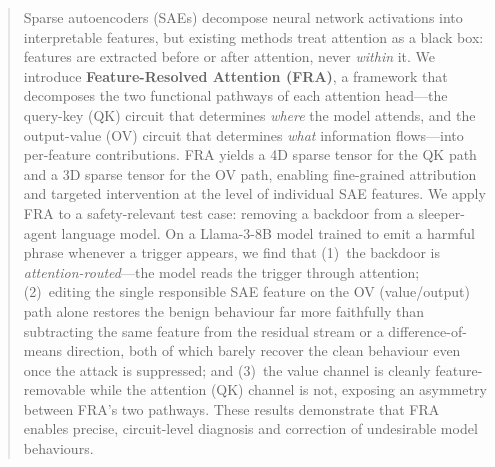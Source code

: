 \documentclass{article}
\theoremstyle{plain}
\theoremstyle{definition}
\theoremstyle{remark}
\begin{document}

\printAffiliationsAndNotice{\icmlEqualContribution}

\begin{abstract}
Sparse autoencoders (SAEs) decompose neural network activations into interpretable features, but existing methods treat attention as a black box: features are extracted before or after attention, never \emph{within} it. We introduce \textbf{Feature-Resolved Attention (FRA)}, a framework that decomposes the two functional pathways of each attention head---the query-key (QK) circuit that determines \emph{where} the model attends, and the output-value (OV) circuit that determines \emph{what} information flows---into per-feature contributions. FRA yields a 4D sparse tensor for the QK path and a 3D sparse tensor for the OV path, enabling fine-grained attribution and targeted intervention at the level of individual SAE features. We apply FRA to a safety-relevant test case: removing a backdoor from a sleeper-agent language model. On a Llama-3-8B model trained to emit a harmful phrase whenever a trigger appears, we find that (1)~the backdoor is \emph{attention-routed}---the model reads the trigger through attention; (2)~editing the single responsible SAE feature on the OV (value/output) path alone restores the benign behaviour far more faithfully than subtracting the same feature from the residual stream or a difference-of-means direction, both of which barely recover the clean behaviour even once the attack is suppressed; and (3)~the value channel is cleanly feature-removable while the attention (QK) channel is not, exposing an asymmetry between FRA's two pathways. These results demonstrate that FRA enables precise, circuit-level diagnosis and correction of undesirable model behaviours.
\end{abstract}
\end{document}
